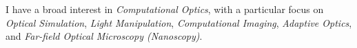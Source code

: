 I have a broad interest in \textit{Computational Optics}, with a particular focus on \textit{Optical Simulation}, \textit{Light Manipulation}, \textit{Computational Imaging}, \textit{Adaptive Optics}, and \textit{Far-field Optical Microscopy (Nanoscopy)}.